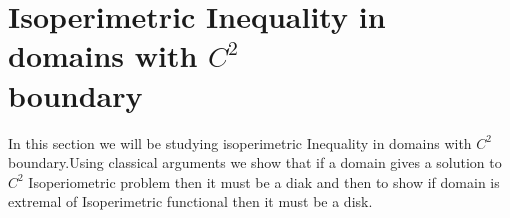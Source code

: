 \documentclass[oneside]{book}
\begin{document}
	
	
	
	
	\section{Isoperimetric Inequality in domains with $C^{2}$ \\boundary} 
	\label{s:3}
	In this section we will be studying isoperimetric Inequality in domains with $C^{2}$ boundary.Using classical arguments we show that if a domain gives a solution to $C^{2}$  Isoperiometric problem then it must be a diak and then to show if domain is extremal of Isoperimetric functional then it must be a disk.
	
	
	
	
	
	
	
	
	
	
	
	
	
	
	
	
	
	
	
\end{document}
